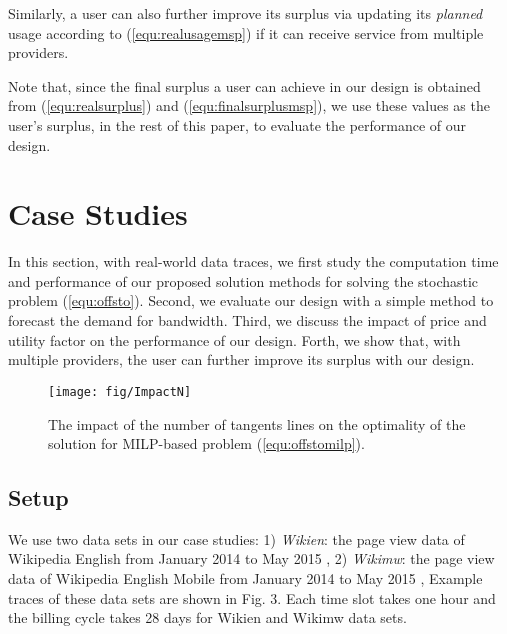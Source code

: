\documentclass[10pt,journal,compsoc]{IEEEtran}
\begin{document}
Similarly, a user can also further improve its surplus via updating its \emph{planned} usage according to (\ref{equ:realusagemsp}) if it can receive service from multiple providers.

Note that, since the final surplus  a user can achieve in  our design is obtained from (\ref{equ:realsurplus}) and (\ref{equ:finalsurplusmsp}), we use these values as the user's surplus, in the rest of this paper, to evaluate the performance of our design.

\section{Case Studies}
In this section, with real-world data traces, we first study the computation time and performance of our proposed solution methods for solving the stochastic problem (\ref{equ:offsto}). Second, we evaluate our design with a simple method to forecast the demand for bandwidth. Third, we discuss the impact of price and utility factor on the performance of our design. Forth, we show that, with multiple providers, the user can further improve its surplus with our design.






















\begin{figure}[!t]
	\centering
	\texttt{[image: fig/ImpactN]}
	\caption{The impact of the number of tangents lines on the optimality of the solution for MILP-based  problem (\ref{equ:offstomilp}).}\label{fig:impactN}
\end{figure}




\subsection{Setup}\label{subsec:evaluationsetup}






We use two data sets in our case studies: 1) \emph{Wikien}: the page view data of Wikipedia English from January 2014 to May 2015 \cite{Wikipageview}, 2) \emph{Wikimw}: the page view data of Wikipedia English Mobile from January 2014 to May 2015 \cite{Wikipageview},  Example traces of these data sets are shown in Fig. 3. Each time slot takes one hour and the billing cycle takes 28 days for Wikien and Wikimw data sets.
\end{document}
